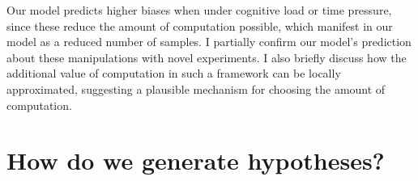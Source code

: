 Our model predicts higher biases when under cognitive load or time pressure, since these reduce the amount of computation possible, which manifest in our model as a reduced number of samples. I partially confirm our model’s prediction about these manipulations with novel experiments. I also briefly discuss how the additional value of computation in such a framework can be locally approximated, suggesting a plausible mechanism for choosing the amount of computation.

%
%



\section{How do we generate hypotheses?}

